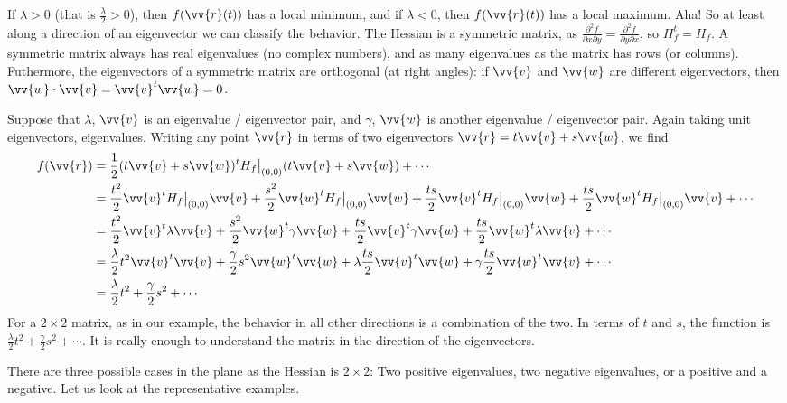 \documentclass[12pt]{article}
\begin{document}
If $\lambda > 0$ (that is $\frac{\lambda}{2} > 0$), then
$f(\vv{r}(t))$ has a local minimum, and if 
$\lambda < 0$, then
$f(\vv{r}(t))$ has a local maximum.  Aha!  So at least along a direction of
an eigenvector we can classify the behavior.
The Hessian is a
symmetric matrix, as
$\frac{\partial^2 f}{\partial x \partial y} = 
\frac{\partial^2 f}{\partial y \partial x}$, so $H_f^t = H_f$.  A symmetric
matrix always has real eigenvalues (no complex numbers),
and as many eigenvalues as the matrix has rows (or columns).
Futhermore, the eigenvectors of a symmetric matrix are orthogonal (at right angles): if $\vv{v}$ and
$\vv{w}$ are different eigenvectors, then
$\vv{w} \cdot \vv{v} = \vv{v}^t \vv{w} = 0$.

Suppose that $\lambda$, $\vv{v}$ is an eigenvalue / eigenvector pair,
and $\gamma$, $\vv{w}$ is another eigenvalue / eigenvector pair.  Again
taking unit eigenvectors, eigenvalues.
Writing any point $\vv{r}$ in terms of two eigenvectors
$\vv{r} = t \vv{v} + s \vv{w}$, we find
\begin{equation*}
\begin{split}
f(\vv{r}) & = 
\frac{1}{2} (t \vv{v} + s \vv{w})^{t} H_f\big|_{(0,0)} (t \vv{v} + s \vv{w})
+
\cdots 
\\
& =
\frac{t^2}{2} \vv{v}^{t} H_f\big|_{(0,0)} \vv{v}
+
\frac{s^2}{2} \vv{w}^{t} H_f\big|_{(0,0)} \vv{w}
+
\frac{ts}{2} \vv{v}^{t} H_f\big|_{(0,0)} \vv{w}
+
\frac{ts}{2} \vv{w}^{t} H_f\big|_{(0,0)} \vv{v}
+
\cdots 
\\
& =
\frac{t^2}{2} \vv{v}^{t} \lambda \vv{v}
+
\frac{s^2}{2} \vv{w}^{t} \gamma \vv{w}
+
\frac{ts}{2} \vv{v}^{t} \gamma \vv{w}
+
\frac{ts}{2} \vv{w}^{t} \lambda \vv{v}
+
\cdots 
\\
& =
\frac{\lambda}{2} t^2 \vv{v}^{t} \vv{v}
+
\frac{\gamma}{2} s^2 \vv{w}^{t} \vv{w}
+
\lambda \frac{ts}{2} \vv{v}^{t} \vv{w}
+
\gamma \frac{ts}{2} \vv{w}^{t} \vv{v}
+
\cdots 
\\
& =
\frac{\lambda}{2} t^2
+
\frac{\gamma}{2} s^2
+
\cdots 
\end{split}
\end{equation*}
For a $2 \times 2$ matrix, as in our example, the behavior
in all other directions is a combination of the two.  In terms
of $t$ and $s$, the function is $\frac{\lambda}{2} t^2 + \frac{\gamma}{2}
s^2 + \cdots$.
It is really
enough to understand the matrix in the direction of the eigenvectors.

There are three possible cases in the plane as the Hessian
is $2 \times 2$:  Two positive eigenvalues,
two negative eigenvalues, or a positive and a negative.
Let us look at the representative examples.
\end{document}
